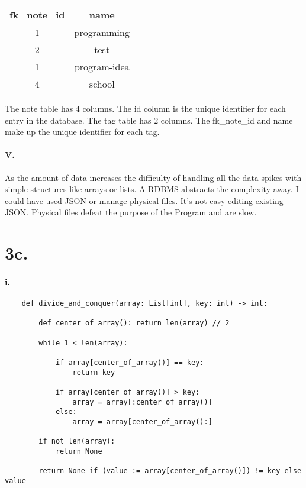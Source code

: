 \documentclass[12pt]{report}
\begin{document}
\begin{center}
 \begin{tabular}{||c c||} 
 \hline
 fk\_note\_id & name \\ [0.5ex] 
 \hline\hline
 1 & programming \\ 
 \hline
 2 & test \\ 
 \hline
 1 & program-idea \\ 
 \hline
 4 & school \\ 
 \hline
\end{tabular}
\end{center}

The note table has 4 columns. The id column is the unique identifier for each entry in the database.
The tag table has 2 columns. The fk\_note\_id and name make up the unique identifier for each tag.

\paragraph{V.}
As the amount of data increases the difficulty of handling all the data spikes with simple structures like arrays or lists. A RDBMS abstracts the complexity away. I could have used JSON or manage physical files. It’s not easy editing existing JSON. 
Physical files defeat the purpose of the Program and are slow.

\section{3c.}
\paragraph{i.}
\begin{lstlisting}
    def divide_and_conquer(array: List[int], key: int) -> int:

        def center_of_array(): return len(array) // 2

        while 1 < len(array):

            if array[center_of_array()] == key:
                return key

            if array[center_of_array()] > key:
                array = array[:center_of_array()]
            else:
                array = array[center_of_array():]

        if not len(array):
            return None

        return None if (value := array[center_of_array()]) != key else value

\end{lstlisting}
\end{document}
